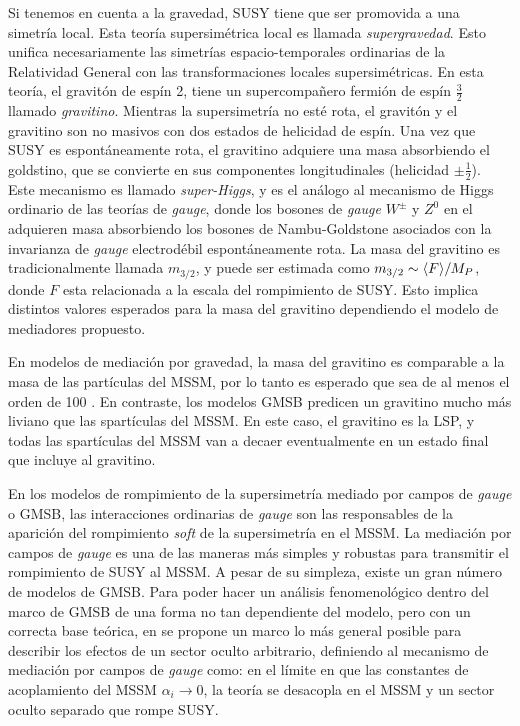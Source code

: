 Si tenemos en cuenta a la gravedad, SUSY tiene que ser promovida a una simetría
local. Esta teoría supersimétrica local es llamada \emph{supergravedad}. Esto
unifica necesariamente las simetrías espacio-temporales ordinarias de la
Relatividad General con las transformaciones locales supersimétricas. En esta
teoría, el gravitón de espín 2, tiene un supercompa\~nero fermión de espín $\frac{3}{2}$
llamado \emph{gravitino}. Mientras la supersimetría no esté rota, el gravitón y
el gravitino son no masivos con dos estados de helicidad de espín. Una vez que
SUSY es espontáneamente rota, el gravitino adquiere una masa absorbiendo el
goldstino, que se convierte en sus componentes longitudinales (helicidad $\pm
\frac{1}{2}$). Este mecanismo es llamado \emph{super-Higgs}, y es el análogo al
mecanismo de Higgs ordinario de las teorías de \emph{gauge}, donde los bosones de \emph{gauge}
$W^\pm$ y $Z^0$ en el {\SM} adquieren masa absorbiendo los bosones de
Nambu-Goldstone asociados con la invarianza de \emph{gauge} electrodébil
espontáneamente rota. La masa del gravitino es tradicionalmente llamada
$m_{3/2}$, y puede ser estimada como $m_{3/2} \sim \langle F \rangle / M_P$,
donde $F$ esta relacionada a la escala del rompimiento de SUSY. Esto implica
distintos valores esperados para la masa del gravitino dependiendo el modelo de
mediadores propuesto.

En modelos de mediación por gravedad, la masa del gravitino es comparable a la
masa de las partículas del MSSM, por lo tanto es esperado que sea de al menos el
orden de 100 \gev. En contraste, los modelos GMSB predicen un gravitino mucho
más liviano que las spartículas del MSSM. En este caso, el gravitino es la LSP,
y todas las spartículas del MSSM van a decaer eventualmente en un estado final
que incluye al gravitino.

En los modelos de rompimiento de la supersimetría mediado por campos de \emph{gauge} o
GMSB, las interacciones ordinarias de \emph{gauge} son las responsables de la aparición
del rompimiento \emph{soft} de la supersimetría en el MSSM.
La mediación por campos de \emph{gauge} es una de las maneras más simples y robustas
para transmitir el rompimiento de SUSY al MSSM. A pesar de su simpleza, existe
un gran número de modelos de GMSB. Para poder hacer un análisis fenomenológico
dentro del marco de GMSB de una forma no tan dependiente del modelo, pero con un
correcta base teórica, en \cite{GGM} se propone un marco lo más general posible
para describir los efectos de un sector oculto arbitrario, definiendo al
mecanismo de mediación por campos de \emph{gauge} como: en el límite en que las
constantes de acoplamiento del MSSM $\alpha_i \to 0$, la teoría se desacopla
en el MSSM y un sector oculto separado que rompe SUSY.

